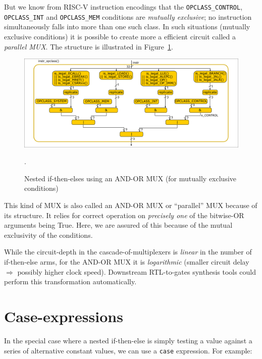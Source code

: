 But we know from RISC-V instruction encodings that the
\verb|OPCLASS_CONTROL|, \verb|OPCLASS_INT| and \verb|OPCLASS_MEM|
conditions are \emph{mutually exclusive}; no instruction
simultaneously falls into more than one such class.  In such
situations (mutually exclusive conditions) it is possible to create
more a efficient circuit called a \emph{parallel MUX}.  The structure
is illustrated in Figure~\ref{Fig_Combo_Multiplexer_Parallel}.
\begin{figure}[htbp]
  \centerline{\includegraphics[width=6in,angle=0]{Figures/Fig_Combo_Multiplexer_Parallel}}
  \caption{\label{Fig_Combo_Multiplexer_Parallel}
           Nested if-then-elses using an AND-OR MUX (for mutually exclusive conditions)}.
\end{figure}

This kind of MUX is also called an AND-OR MUX or ``parallel'' MUX
because of its structure.  It relies for correct operation on
\emph{precisely one} of the bitwise-OR arguments being True.  Here, we
are assured of this because of the mutual exclusivity of the
conditions.

While the circuit-depth in the cascade-of-multiplexers is
\emph{linear} in the number of if-then-else arms, for the AND-OR MUX
it is \emph{logarithmic} (smaller circuit delay $\Longrightarrow$
possibly higher clock speed).  Downstream RTL-to-gates synthesis tools
could perform this transformation automatically.


\section{Case-expressions}

\label{BSV_case_expressions}


In the special case where a nested if-then-else is simply testing a
value against a series of alternative constant values, we can use a
\verb|case| expression.  For example:

